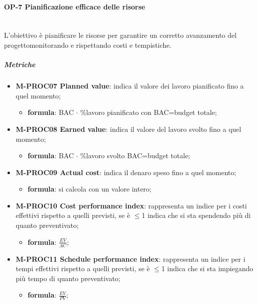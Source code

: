 			\paragraph{OP-7 Pianificazione efficace delle risorse} \mbox{}\\ [1mm]
			L'obiettivo è pianificare le risorse per garantire un corretto avanzamento del progetto\glosp monitorando e rispettando costi e tempistiche.
			\subparagraph{Metriche}
			\begin{itemize}		
				\item \textbf{M-PROC07 Planned value}: indica il valore dei lavoro pianificato fino a quel momento;
				\begin{itemize}
					\item[] \textbf{formula}: BAC $\cdot$ \%lavoro pianificato con BAC=budget totale;
				\end{itemize}
				
				\item \textbf{M-PROC08 Earned value}: indica il valore del lavoro svolto fino a quel momento;
				\begin{itemize}
					\item[] \textbf{formula}: BAC $\cdot$ \%lavoro svolto BAC=budget totale;
				\end{itemize} 
				
				\item \textbf{M-PROC09 Actual cost}: indica il denaro speso fino a quel momento; 
				\begin{itemize}
					\item[] \textbf{formula}: si calcola con un valore intero;
				\end{itemize}
				
				\item \textbf{M-PROC10 Cost performance index}: rappresenta un indice per i costi effettivi rispetto a quelli previsti, se è $\le$1 indica che si sta spendendo più di quanto preventivato;
				\begin{itemize}
					\item[] \textbf{formula}: $\frac{EV}{AC}$; 
				\end{itemize}
				
				\item \textbf{M-PROC11 Schedule performance index}: rappresenta un indice per i tempi effettivi rispetto a quelli previsti, se è $\le$1 indica che si sta impiegando più tempo di quanto preventivato;
				\begin{itemize}
					\item[] \textbf{formula}: $\frac{EV}{PV}$; 
				\end{itemize}
				

\end{itemize}
